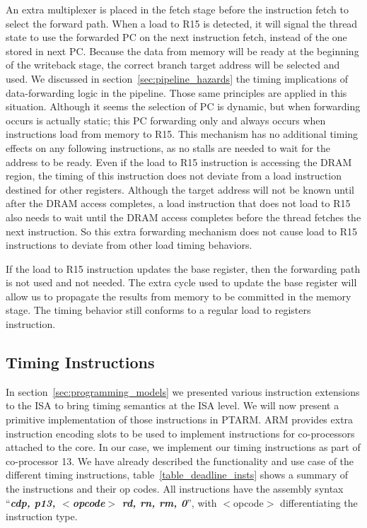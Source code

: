 An extra multiplexer is placed in the fetch stage before the instruction fetch to select the forward path.
When a load to R15 is detected, it will signal the thread state to use the forwarded PC on the next instruction fetch, instead of the one stored in next PC.
Because the data from memory will be ready at the beginning of the writeback stage, the correct branch target address will be selected and used.
We discussed in section~\ref{sec:pipeline_hazards} the timing implications of data-forwarding logic in the pipeline.
Those same principles are applied in this situation.
Although it seems the selection of PC is dynamic, but when forwarding occurs is actually static; this PC forwarding only and always occurs when instructions load from memory to R15.
This mechanism has no additional timing effects on any following instructions, as no stalls are needed to wait for the address to be ready. 
Even if the load to R15 instruction is accessing the DRAM region, the timing of this instruction does not deviate from a load instruction destined for other registers.
Although the target address will not be known until after the DRAM access completes, a load instruction that does not load to R15 also needs to wait until the DRAM access completes before the thread fetches the next instruction. 
So this extra forwarding mechanism does not cause load to R15 instructions to deviate from other load timing behaviors.

If the load to R15 instruction updates the base register, then the forwarding path is not used and not needed. 
The extra cycle used to update the base register will allow us to propagate the results from memory to be committed in the memory stage.
The timing behavior still conforms to a regular load to registers instruction. 

\subsection{Timing Instructions}
In section~\ref{sec:programming_models} we presented various instruction extensions to the ISA to bring timing semantics at the ISA level.
We will now present a primitive implementation of those instructions in PTARM.  
ARM provides extra instruction encoding slots to be used to implement instructions for co-processors attached to the core. 
In our case, we implement our timing instructions as part of co-processor 13.
We have already described the functionality and use case of the different timing instructions, table~\ref{table_deadline_insts} shows a summary of the instructions and their op codes.
All instructions have the assembly syntax ``\textbf{\textit{cdp, p13, $<$opcode$>$ rd, rn, rm, 0}}'', with $<$opcode$>$ differentiating the instruction type.
   
